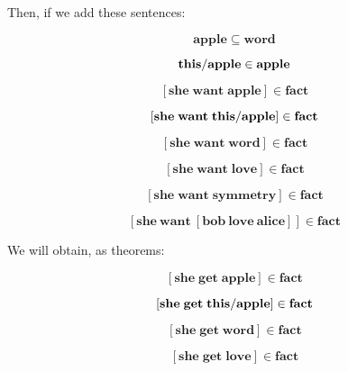 \documentclass{IOS-Book-Article}     %
\begin{document}
Then, if we add these sentences:

\begin{equation}
  \mathbf{apple}\subseteq \mathbf{word}
\end{equation}

\begin{equation}
  \mathbf{this\-/apple}\in \mathbf{apple}
\end{equation}

\begin{equation}
  \left[\mathbf{she\; want\; apple}\right]\in \mathbf{fact}
\end{equation}

\begin{equation}
  \left[\mathbf{she\; want\; this\-/apple}\right]\in \mathbf{fact}
\end{equation}

\begin{equation}
  \left[\mathbf{she\; want\; word}\right]\in \mathbf{fact}
\end{equation}

\begin{equation}
  \left[\mathbf{she\; want\; love}\right]\in \mathbf{fact}
\end{equation}

\begin{equation}
  \left[\mathbf{she\; want\; symmetry}\right]\in \mathbf{fact}
\end{equation}

\begin{equation}
  \left[\mathbf{she\: want\: \left[bob\: love\: alice\right]}\right]\in \mathbf{fact}
\end{equation}

We will obtain, as theorems:

\begin{equation}
  \left[\mathbf{she\; get\; apple}\right]\in \mathbf{fact}
\end{equation}

\begin{equation}
  \left[\mathbf{she\; get\; this\-/apple}\right]\in \mathbf{fact}
\end{equation}

\begin{equation}
  \left[\mathbf{she\; get\; word}\right]\in \mathbf{fact}
\end{equation}

\begin{equation}
  \left[\mathbf{she\; get\; love}\right]\in \mathbf{fact}
\end{equation}
\end{document}
